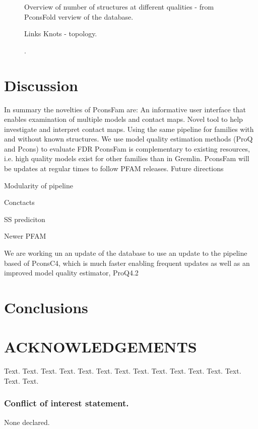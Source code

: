 \documentclass[a4,center,fleqn]{NAR}
\begin{document}
\begin{figure}[t]
\begin{center}
\end{center}
\caption{Overview of number of structures at different qualities - from PconsFold
verview of the database.}
\label{fig:overview}
\end{figure}


\begin{figure}[t]
\begin{center}
\end{center}
\caption{Links Knots - topology.}
\label{fig:Interface}
\end{figure}


\begin{figure}[t]
\begin{center}
\end{center}
\caption{.}
\label{fig:exampel PF0009.24}
\end{figure}








\section{Discussion}



                
In summary the novelties of PconsFam are:
An informative user interface that enables examination of multiple models and contact maps.
Novel tool to help investigate and interpret contact maps.
Using the same pipeline for families with and without known structures.
We use model quality estimation methods (ProQ and Pcons) to evaluate FDR 
PconsFam is complementary to existing resources, i.e. high quality models exist for other families than in Gremlin.
PconsFam will be updates at regular times to follow PFAM releases.
Future directions

Modularity of pipeline


Conctacts

SS prediciton

Newer PFAM


We are working un an  update of the 
database to use an update to the pipeline based of PconsC4, which is
much faster enabling frequent updates as well as an improved model
quality estimator, ProQ4.2

\section{Conclusions}





\section{ACKNOWLEDGEMENTS}

Text. Text. Text. Text. Text. Text. Text. Text. Text. Text. Text.
Text. Text. Text. Text.


\subsubsection{Conflict of interest statement.} None declared.



\end{document}

